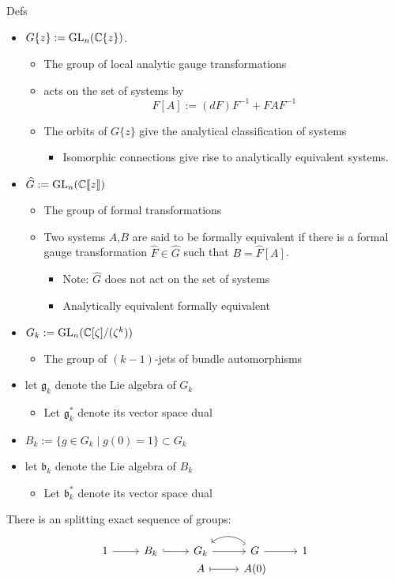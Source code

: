 \begin{frame}[fragile]{Defs}
  \begin{itemize}
    \item $G\{z\}:=\operatorname{GL}_n(\mathbb{C}\{z\})$.
      \begin{itemize}
        \item The group of local analytic gauge transformations
        \item acts on the set of systems by
          \[
            F[A]:=(dF)F^{-1}+FAF^{-1}
          \]
        \item The orbits of $G\{z\}$ give the analytical classification of
          systems
          \begin{itemize}
            \item Isomorphic connections give rise to analytically equivalent
              systems.
          \end{itemize}
      \end{itemize}
    \item $\widehat G:=\operatorname{GL}_n(\mathbb{C}\llbracket z\rrbracket)$
      \begin{itemize}
        \item The group of formal transformations
        \item Two systems $A$,$B$ are said to be formally equivalent if there
          is a formal gauge transformation $\hat F\in\hat G$ such that
          $B=\hat F[A]$.
          \begin{itemize}
            \item Note: $\hat G$ does not act on the set of systems
            \item Analytically equivalent \Rightarrow formally equivalent
          \end{itemize}
      \end{itemize}
    \item $G_k:=\operatorname{GL}_n(\mathbb{C}[\zeta]/(\zeta^k))$
      \begin{itemize}
        \item The group of $(k-1)$-jets of bundle automorphisms
      \end{itemize}
    \item let $\mathfrak{g}_k$ denote the Lie algebra of $G_k$
    \begin{itemize}
      \item Let $\mathfrak{g}_k^*$ denote its vector space dual
    \end{itemize}
    \item $B_k:=\{g\in G_k\mid g(0)=1\}\subset G_k$
    \item let $\mathfrak{b}_k$ denote the Lie algebra of $B_k$
    \begin{itemize}
      \item Let $\mathfrak{b}_k^*$ denote its vector space dual
    \end{itemize}
  \end{itemize}
  There is an splitting exact sequence of groups:
  \[ \begin{tikzcd}[row sep=0]
  1 \rar & B_k \arrow[hook]{r} & G_k \rar & G \arrow[hook,bend right=40]{l}
    \rar & 1\\
  & & A \arrow[|->]{r}& A(0)
  \end{tikzcd} \]
\end{frame}

